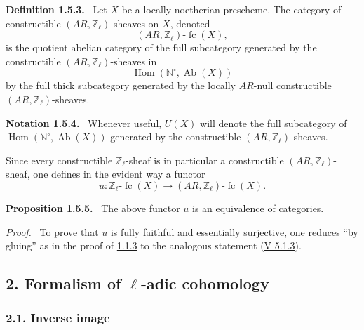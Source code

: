 \documentclass[11pt]{article}
\newenvironment{statement}[1]{\par\medskip\noindent\textbf{#1.}\ }{\par\medskip}
\newenvironment{prooftext}[1][Proof]{\par\noindent\emph{#1.}\ }{\par\medskip}
\DeclareMathOperator{\Hom}{Hom}
\providecommand{\Hom}{\operatorname{Hom}}
\providecommand{\Ab}{\operatorname{Ab}}
\providecommand{\fc}{\operatorname{fc}}
\providecommand{\Ab}{\operatorname{Ab}}
\providecommand{\Hom}{\operatorname{Hom}}
\begin{document}
\label{sga5:VI:definition:1.5.3}\begin{statement}{Definition 1.5.3}
Let \(X\) be a locally noetherian prescheme. The category of constructible \((AR,\mathbb Z_\ell)\)-sheaves on \(X\), denoted
\[
(AR,\mathbb Z_\ell)\text{-}\fc(X),
\]
is the quotient abelian category of the full subcategory generated by the constructible \((AR,\mathbb Z_\ell)\)-sheaves in
\[
\Hom(\mathbb N^\circ,\Ab(X))
\]
by the full thick subcategory generated by the locally \(AR\)-null constructible \((AR,\mathbb Z_\ell)\)-sheaves.
\end{statement}

\label{sga5:VI:notation:1.5.4}\begin{statement}{Notation 1.5.4}
Whenever useful, \(U(X)\) will denote the full subcategory of \(\Hom(\mathbb N^\circ,\Ab(X))\) generated by the constructible \((AR,\mathbb Z_\ell)\)-sheaves.
\end{statement}

Since every constructible \(\mathbb Z_\ell\)-sheaf is in particular a constructible \((AR,\mathbb Z_\ell)\)-sheaf, one defines in the evident way a functor
\[
u:\mathbb Z_\ell\text{-}\fc(X)\longrightarrow (AR,\mathbb Z_\ell)\text{-}\fc(X).
\]

\label{sga5:VI:proposition:1.5.5}\begin{statement}{Proposition 1.5.5}
The above functor \(u\) is an equivalence of categories.
\end{statement}

\begin{prooftext}[Proof]
To prove that \(u\) is fully faithful and essentially surjective, one reduces ``by gluing'' as in the proof of \hyperref[sga5:VI:proposition:1.1.3]{1.1.3} to the analogous statement (\hyperref[sga5:V:definition:5.1.3]{V 5.1.3}).
\end{prooftext}

\subsection*{2. Formalism of \(\ell\)-adic cohomology}\label{sga5:VI:subsection:2}

\subsubsection*{2.1. Inverse image}\label{sga5:VI:subsubsection:2.1}
\end{document}
